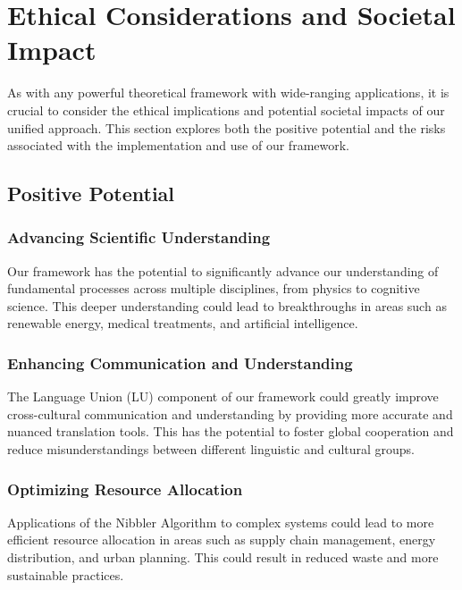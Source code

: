 
\section{Ethical Considerations and Societal Impact}

As with any powerful theoretical framework with wide-ranging applications, it is crucial to consider the ethical implications and potential societal impacts of our unified approach. This section explores both the positive potential and the risks associated with the implementation and use of our framework.

\subsection{Positive Potential}

\subsubsection{Advancing Scientific Understanding}

Our framework has the potential to significantly advance our understanding of fundamental processes across multiple disciplines, from physics to cognitive science. This deeper understanding could lead to breakthroughs in areas such as renewable energy, medical treatments, and artificial intelligence.

\subsubsection{Enhancing Communication and Understanding}

The Language Union (LU) component of our framework could greatly improve cross-cultural communication and understanding by providing more accurate and nuanced translation tools. This has the potential to foster global cooperation and reduce misunderstandings between different linguistic and cultural groups.

\subsubsection{Optimizing Resource Allocation}

Applications of the Nibbler Algorithm to complex systems could lead to more efficient resource allocation in areas such as supply chain management, energy distribution, and urban planning. This could result in reduced waste and more sustainable practices.

